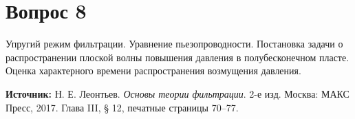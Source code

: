 \documentclass[12pt,a4paper]{article}
\begin{document}
\section*{Вопрос 8}
\noindent Упругий режим фильтрации. Уравнение пьезопроводности. Постановка задачи о распространении плоской волны повышения давления в полубесконечном пласте. Оценка характерного времени распространения возмущения давления.

\medskip
\noindent\textbf{Источник:} Н. Е. Леонтьев. \textit{Основы теории фильтрации}. 2-е изд. Москва: МАКС Пресс, 2017. Глава III, § 12, печатные страницы 70--77.
\par\bigskip

\end{document}
